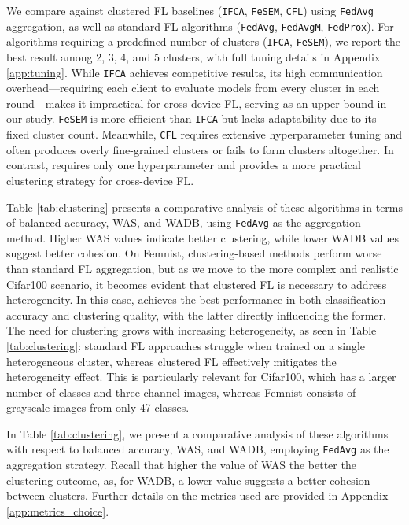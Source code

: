 We compare \shortname against clustered FL baselines (\texttt{IFCA}, \texttt{FeSEM}, \texttt{CFL}) using \texttt{FedAvg} aggregation, as well as standard FL algorithms (\texttt{FedAvg}, \texttt{FedAvgM}, \texttt{FedProx}). For algorithms requiring a predefined number of clusters (\texttt{IFCA}, \texttt{FeSEM}), we report the best result among 2, 3, 4, and 5 clusters, with full tuning details in Appendix \ref{app:tuning}. While \texttt{IFCA} achieves competitive results, its high communication overhead—requiring each client to evaluate models from every cluster in each round—makes it impractical for cross-device FL, serving as an upper bound in our study. \texttt{FeSEM} is more efficient than \texttt{IFCA} but lacks adaptability due to its fixed cluster count. Meanwhile, \texttt{CFL} requires extensive hyperparameter tuning and often produces overly fine-grained clusters or fails to form clusters altogether. In contrast, \shortname requires only one hyperparameter and provides a more practical clustering strategy for cross-device FL.

Table \ref{tab:clustering} presents a comparative analysis of these algorithms in terms of balanced accuracy, WAS, and WADB, using \texttt{FedAvg} as the aggregation method. Higher WAS values indicate better clustering, while lower WADB values suggest better cohesion. On Femnist, clustering-based methods perform worse than standard FL aggregation, but as we move to the more complex and realistic Cifar100 scenario, it becomes evident that clustered FL is necessary to address heterogeneity. In this case, \shortname achieves the best performance in both classification accuracy and clustering quality, with the latter directly influencing the former. The need for clustering grows with increasing heterogeneity, as seen in Table \ref{tab:clustering}: standard FL approaches struggle when trained on a single heterogeneous cluster, whereas clustered FL effectively mitigates the heterogeneity effect. This is particularly relevant for Cifar100, which has a larger number of classes and three-channel images, whereas Femnist consists of grayscale images from only 47 classes.


In Table \ref{tab:clustering}, we present a comparative analysis of these algorithms with respect to balanced accuracy, WAS, and WADB, employing \texttt{FedAvg} as the aggregation strategy. Recall that higher the value of  WAS the better the clustering outcome, as, for WADB, a lower value suggests a better cohesion between clusters. Further details on the metrics used are provided in Appendix \ref{app:metrics_choice}.


